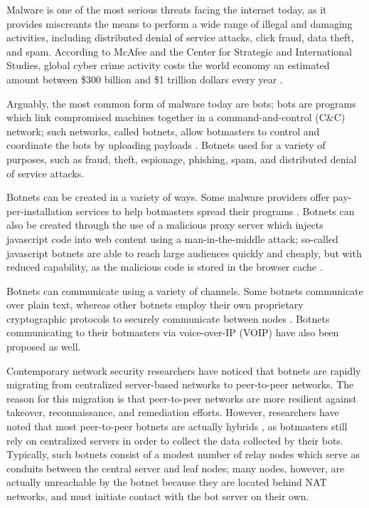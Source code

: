 \documentclass{acm_proc_article-sp}
\begin{document}
Malware is one of the most serious threats facing the internet today, as it provides miscreants the means to perform a wide range of illegal and damaging activities, including distributed denial of service attacks, click fraud, data theft, and spam. According to McAfee and the Center for Strategic and International Studies, global cyber crime activity costs the world economy an estimated amount between \$300 billion and \$1 trillion dollars every year \cite{lewis:economics}.

Arguably, the most common form of malware today are bots; bots are programs which link compromised machines together in a command-and-control (C\&C) network; such networks, called botnets, allow botmasters to control and coordinate the bots by uploading payloads \cite{jacob:infiltration}.  Botnets used for a variety of purposes, such as fraud, theft, espionage, phishing, spam, and distributed denial of service attacks.

Botnets can be created in a variety of ways.  Some malware providers offer pay-per-installation services to help botmasters spread their programs \cite{caballero:distribution}.  Botnets can also be created through the use of a malicious proxy server which injects javascript code into web content using a man-in-the-middle attack; so-called javascript botnets are able to reach large audiences quickly and cheaply, but with reduced capability, as the malicious code is stored in the browser cache \cite{defcon:javascript}.

Botnets can communicate using a variety of channels.  Some botnets communicate over plain text, whereas other botnets employ their own proprietary cryptographic protocols to securely communicate between nodes \cite{stone:takeover}.  Botnets communicating to their botmasters via voice-over-IP (VOIP) have also been proposed \cite{defcon:voip} as well.  

Contemporary network security researchers have noticed that botnets are rapidly migrating from centralized server-based networks to peer-to-peer networks.\cite{botnet:history}  The reason for this migration is that peer-to-peer networks are more resilient against takeover, reconnaissance, and remediation efforts.  However, researchers have noted that most peer-to-peer botnets are actually hybrids \cite{defcon:prowling}, as botmasters still rely on centralized servers in order to collect the data collected by their bots.  Typically, such botnets consist of a modest number of relay nodes which serve as conduits between the central server and leaf nodes; many nodes, however, are actually unreachable by the botnet because they are located behind NAT networks, and must initiate contact with the bot server on their own. 
\end{document}
